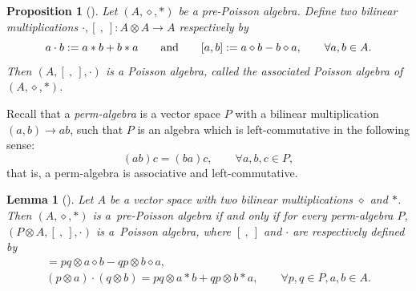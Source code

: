 \documentclass[pdftex]{sigma}
\numberwithin{equation}{section}
\newtheorem{Lemma}[Theorem]{Lemma}
\newtheorem{Proposition}[Theorem]{Proposition}
{ \theoremstyle{definition}
	\newtheorem{Definition}[Theorem]{Definition}
	\newtheorem{Note}[Theorem]{Note}
	\newtheorem{Example}[Theorem]{Example}
	\newtheorem{Remark}[Theorem]{Remark} }
\begin{document}
\begin{Proposition}[{\cite[Proposition~2.2]{aguiar2000pre}}]\label{pro:pptp}
 Let $(A, \diamond, \ast)$ be a pre-Poisson algebra.
 Define two bilinear multiplications $\cdot, [\ ,\ ]\colon A\otimes A\rightarrow A$ respectively by
 \begin{equation}
 a \cdot b := a \ast b + b \ast a \qquad {\rm and} \qquad
 [a, b] := a \diamond b - b \diamond a, \qquad
 \forall a, b \in A. \label{eq:pptp}
 \end{equation}
 Then $(A, [\ ,\ ], \cdot)$ is a Poisson algebra,
 called the \textit{associated Poisson algebra of $(A, \diamond, \ast)$}.
\end{Proposition}

Recall that a \textit{perm-algebra} is a vector space $P$ with a bilinear multiplication $(a,b) \to ab$,
such that $P$ is an algebra which is left-commutative in the following sense:
\begin{equation*}
	(ab)c = (ba)c, \qquad \forall a, b, c \in P,
\end{equation*}
that is, a perm-algebra is associative and left-commutative.

\begin{Lemma}[\cite{gubarev2014operads}]\label{lem:perm}
Let $A$ be a vector space with two bilinear multiplications $\diamond$ and $*$.
Then $(A, \diamond , *)$ is a~pre-Poisson algebra if and only if for every perm-algebra $P$,
$(P \otimes A, [\ ,\ ], \cdot)$ is a~Poisson algebra, where $[\ ,\ ]$ and $\cdot$ are respectively defined by
	\begin{gather*}
		[p \otimes a, q \otimes b] = pq \otimes a \diamond b - qp \otimes b \diamond a,\\
		(p \otimes a) \cdot (q \otimes b) = pq \otimes a*b + qp \otimes b*a, \qquad \forall p, q \in P , a, b \in A.
	\end{gather*}
\end{Lemma}
\end{document}
